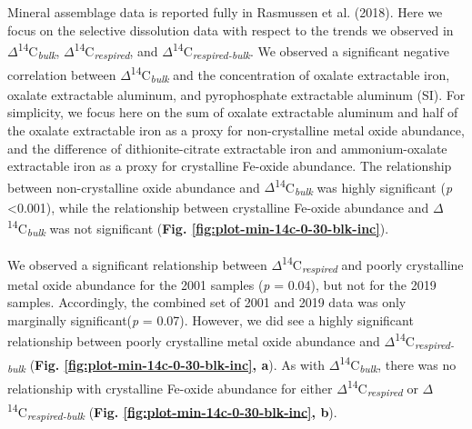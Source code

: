 \documentclass[english,man,floatsintext]{apa6}
\begin{document}
Mineral assemblage data is reported fully in Rasmussen et al. (2018). Here we focus on the selective dissolution data with respect to the trends we observed in \(\Delta\)\textsuperscript{14}C\textsubscript{\emph{bulk}}, \(\Delta\)\textsuperscript{14}C\textsubscript{\emph{respired}}, and \(\Delta\)\textsuperscript{14}C\textsubscript{\emph{respired-bulk}}. We observed a significant negative correlation between \(\Delta\)\textsuperscript{14}C\textsubscript{\emph{bulk}} and the concentration of oxalate extractable iron, oxalate extractable aluminum, and pyrophosphate extractable aluminum (SI). For simplicity, we focus here on the sum of oxalate extractable aluminum and half of the oxalate extractable iron as a proxy for non-crystalline metal oxide abundance, and the difference of dithionite-citrate extractable iron and ammonium-oxalate extractable iron as a proxy for crystalline Fe-oxide abundance. The relationship between non-crystalline oxide abundance and \(\Delta\)\textsuperscript{14}C\textsubscript{\emph{bulk}} was highly significant (\emph{p} \textless{}0.001), while the relationship between crystalline Fe-oxide abundance and \(\Delta\)\textsuperscript{14}C\textsubscript{\emph{bulk}} was not significant (\textbf{Fig. \ref{fig:plot-min-14c-0-30-blk-inc}}).

We observed a significant relationship between \(\Delta\)\textsuperscript{14}C\textsubscript{\emph{respired}} and poorly crystalline metal oxide abundance for the 2001 samples (\emph{p} = 0.04), but not for the 2019 samples. Accordingly, the combined set of 2001 and 2019 data was only marginally significant(\emph{p} = 0.07). However, we did see a highly significant relationship between poorly crystalline metal oxide abundance and \(\Delta\)\textsuperscript{14}C\textsubscript{\emph{respired-bulk}} (\textbf{Fig. \ref{fig:plot-min-14c-0-30-blk-inc}, a}). As with \(\Delta\)\textsuperscript{14}C\textsubscript{\emph{bulk}}, there was no relationship with crystalline Fe-oxide abundance for either \(\Delta\)\textsuperscript{14}C\textsubscript{\emph{respired}} or \(\Delta\)\textsuperscript{14}C\textsubscript{\emph{respired-bulk}} (\textbf{Fig. \ref{fig:plot-min-14c-0-30-blk-inc}, b}).
\end{document}

